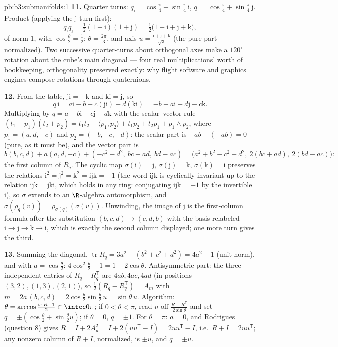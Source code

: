 \begin{solution}{pb:b3:submanifolds:1}
\textbf{11.} Quarter turns: $q_{\mathrm i} =
\cos\frac\pi4 + \sin\frac\pi4\,\mathrm i$, $q_{\mathrm j} =
\cos\frac\pi4 + \sin\frac\pi4\,\mathrm j$. Product
(applying the $\mathrm j$-turn first):
\[
q_{\mathrm i}q_{\mathrm j} = \tfrac12(1 + \mathrm i)(1 +
\mathrm j) = \tfrac12\bigl(1 + \mathrm i + \mathrm j +
\mathrm k\bigr),
\]
of norm $1$, with $\cos\frac\theta2 = \frac12$: $\theta =
\frac{2\pi}3$, and axis $u = \frac{\mathrm i + \mathrm j +
\mathrm k}{\sqrt3}$ (the pure part normalized). Two
successive quarter-turns about orthogonal axes make a
$120^\circ$ rotation about the cube's main diagonal --- four
real multiplications' worth of bookkeeping, orthogonality
preserved exactly: why flight software and graphics engines
compose rotations through quaternions.

\textbf{12.} From the table, $\mathrm{ji} = -\mathrm k$ and
$\mathrm{ki} = \mathrm j$, so
\[
q\,\mathrm i = a\mathrm i - b + c(\mathrm{ji}) +
d(\mathrm{ki}) = -b + a\mathrm i + d\mathrm j - c\mathrm k .
\]
Multiplying by $\bar q = a - b\mathrm i - c\mathrm j -
d\mathrm k$ with the scalar--vector rule $(t_1 + p_1)(t_2 +
p_2) = t_1t_2 - \langle p_1, p_2\rangle + t_1p_2 + t_2p_1 +
p_1\wedge p_2$, where $p_1 = (a, d, -c)$ and $p_2 = (-b, -c,
-d)$: the scalar part is $-ab - (-ab) = 0$ (pure, as it must
be), and the vector part is
\[
b(b, c, d) + a(a, d, -c) + (-c^2 - d^2,\ bc + ad,\ bd - ac)
= \bigl(a^2 + b^2 - c^2 - d^2,\ 2(bc + ad),\ 2(bd -
ac)\bigr):
\]
the first column of $R_q$. The cyclic map $\sigma(\mathrm i)
= \mathrm j$, $\sigma(\mathrm j) = \mathrm k$,
$\sigma(\mathrm k) = \mathrm i$ preserves the relations
$\mathrm i^2 = \mathrm j^2 = \mathrm k^2 = \mathrm{ijk} =
-1$ (the word $\mathrm{ijk}$ is cyclically invariant up to
the relation $\mathrm{ijk} = \mathrm{jki}$, which holds in
any ring: conjugating $\mathrm{ijk} = -1$ by the invertible
$\mathrm i$), so $\sigma$ extends to an $\R$-algebra
automorphism, and $\sigma(\rho_q(v)) =
\rho_{\sigma(q)}(\sigma(v))$. Unwinding, the image of
$\mathrm j$ is the first-column formula after the
substitution $(b, c, d) \to (c, d, b)$ with the basis
relabeled $\mathrm i \to \mathrm j \to \mathrm k \to \mathrm
i$, which is exactly the second column displayed; one more
turn gives the third.

\textbf{13.} Summing the diagonal, $\operatorname{tr}R_q =
3a^2 - (b^2 + c^2 + d^2) = 4a^2 - 1$ (unit norm), and with
$a = \cos\frac\theta2$: $4\cos^2\frac\theta2 - 1 = 1 +
2\cos\theta$. Antisymmetric part: the three independent
entries of $R_q - R_q^{\mathsf T}$ are $4ab, 4ac, 4ad$ (in
positions $(3,2), (1,3), (2,1)$), so $\frac12(R_q -
R_q^{\mathsf T}) = A_m$ with $m = 2a\,(b, c, d) =
2\cos\frac\theta2\sin\frac\theta2\,u = \sin\theta\,u$.
Algorithm: $\theta = \arccos\frac{\operatorname{tr}R -
1}{2} \in \intcc0\pi$; if $0 < \theta < \pi$, read $u$ off
$\frac{R - R^{\mathsf T}}{2\sin\theta}$ and set $q =
\pm(\cos\frac\theta2 + \sin\frac\theta2 u)$; if $\theta =
0$, $q = \pm1$. For $\theta = \pi$: $a = 0$, and Rodrigues
(question 8) gives $R = I + 2A_u^2 = I + 2(uu^{\mathsf T} -
I) = 2uu^{\mathsf T} - I$, i.e.\ $R + I = 2uu^{\mathsf T}$;
any nonzero column of $R + I$, normalized, is $\pm u$, and
$q = \pm u$.


\end{solution}
